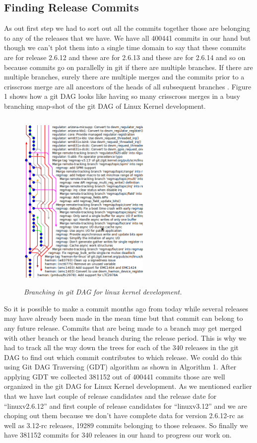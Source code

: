 \documentclass{acm_proc_article-sp}
\begin{document}
\subsection{Finding Release Commits}
As out first step we had to sort out all the commits together those are belonging to any of the releases that we have. We have all 400441 commits in our hand but though we can't plot them into a single time domain to say that these commits are for release 2.6.12 and these are for 2.6.13 and these are for 2.6.14 and so on because commits go on parallelly in git if there are multiple branches. If there are multiple branches, surely there are multiple merges and the commits prior to a crisscross merge are all ancestors of the heads of all subsequent branches \cite{bird_git}. Figure 1 shows how a git DAG looks like having so many crisscross merges in a busy branching snap-shot of the git DAG of Linux Kernel development.
\begin{figure}
\begin{center}
\includegraphics[height=3.5in,width=2.5in]{gitdag.png}
\caption{\small \sl Branching in git DAG for linux kernel development.}
\end{center}
\end{figure}
So it is possible to make a commit months ago from today while several releases may have already been made in the mean time but that commit can belong to any future release. Commits that are being made to a branch may get merged with other branch or the head branch during the release period. This is why we had to track all the way down the trees for each of the 340 releases in the git DAG to find out which commit contributes to which release. We could do this using Git DAG Traversing (GDT) algorithm as shown in Algorithm 1. After applying GDT we collected 381152 out of 400441 commits those are well organized in the git DAG for Linux Kernel development. As we mentioned earlier that we have last couple of release candidates and the release date for ``linuxv2.6.12'' and first couple of release candidates for ``linuxv3.12'' and we are choping out them because we don't have complete data for version 2.6.12-rc as well as 3.12-rc releases, 19289 commits belonging to those releases. So finally we have 381152 commits for 340 releases in our hand to progress our work on.
\end{document}
